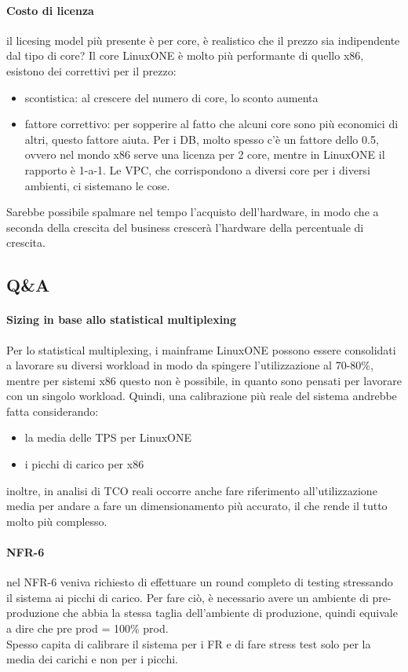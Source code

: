 \documentclass{article}
\begin{document}
\paragraph{Costo di licenza}il licesing model più presente è per core, è realistico che il prezzo sia indipendente dal tipo di core? Il core LinuxONE è molto più performante di quello x86, esistono dei correttivi per il prezzo:
\begin{itemize}
\item scontistica: al crescere del numero di core, lo sconto aumenta
\item fattore correttivo: per sopperire al fatto che alcuni core sono più economici di altri, questo fattore aiuta. Per i DB, molto spesso c'è un fattore dello 0.5, ovvero nel mondo x86 serve una licenza per 2 core, mentre in LinuxONE il rapporto è 1-a-1. Le VPC, che corrispondono a diversi core per i diversi ambienti, ci sistemano le cose.
\end{itemize}
Sarebbe possibile spalmare nel tempo l'acquisto dell'hardware, in modo che a seconda della crescita del business crescerà l'hardware della percentuale di crescita.
\subsection{Q\&A}
\paragraph{Sizing in base allo statistical multiplexing} Per lo statistical multiplexing, i mainframe LinuxONE possono essere consolidati a lavorare su diversi workload in modo da spingere l'utilizzazione al 70-80\%, mentre per sistemi x86 questo non è possibile, in quanto sono pensati per lavorare con un singolo workload. Quindi, una calibrazione più reale del sistema andrebbe fatta considerando:
\begin{itemize}
\item la media delle TPS per LinuxONE
\item i picchi di carico per x86
\end{itemize}
inoltre, in analisi di TCO reali occorre anche fare riferimento all'utilizzazione media per andare a fare un dimensionamento più accurato, il che rende il tutto molto più complesso.
\paragraph{NFR-6}nel NFR-6 veniva richiesto di effettuare un round completo di testing stressando il sistema ai picchi di carico. Per fare ciò, è necessario avere un ambiente di pre-produzione che abbia la stessa taglia dell'ambiente di produzione, quindi equivale a dire che pre prod = 100\% prod.\\ Spesso capita di calibrare il sistema per i FR e di fare stress test solo per la media dei carichi e non per i picchi.
\end{document}
